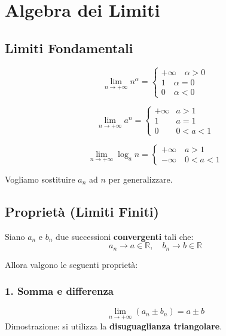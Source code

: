 





\section{Algebra dei Limiti}\label{algebra-de-limiti}

\subsection{Limiti Fondamentali}

\[
\lim_{n \to +\infty} n^{\alpha} = 
\begin{cases}
+\infty \quad \alpha>0\\ 
1 \quad \alpha=0\\ 
0 \quad \alpha<0
\end{cases}
\]

\[
\lim_{n \to +\infty} a^n = 
\begin{cases}
+\infty & a>1\\ 
1 & a=1\\ 
0 & 0<a<1
\end{cases}
\]

\[
\lim_{n \to +\infty} \log_a n = 
\begin{cases}
+\infty \quad a>1\\
-\infty \quad 0<a<1
\end{cases}
\]

Vogliamo sostituire \(a_n\) ad \(n\) per generalizzare.

\subsection{Proprietà (Limiti Finiti)}\label{proprietuxe0}

Siano \(a_n\) e \(b_n\) due successioni \textbf{convergenti} tali che:  
\[a_n \to a \in \mathbb{R}, \quad b_n \to b \in \mathbb{R}\]

Allora valgono le seguenti proprietà:
\subsubsection{1. Somma e differenza}
\[
\lim_{n \to +\infty} (a_n \pm b_n) = a \pm b
\]
Dimostrazione: si utilizza la \textbf{disuguaglianza triangolare}.

